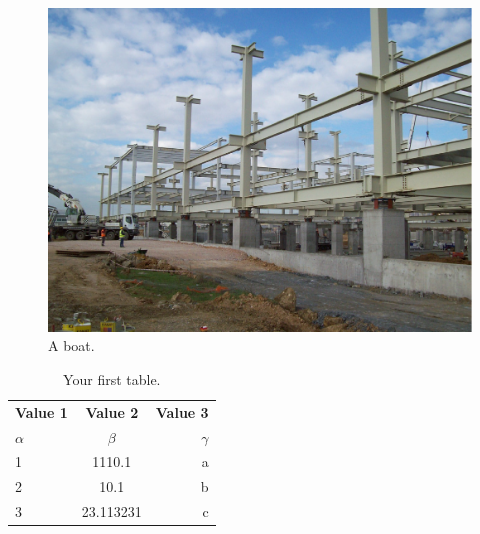 \documentclass[turkish]{eqconf}
\begin{document}
\begin{figure}
	\begin{center}
		\includegraphics[scale=0.4]{b.PNG}
		\caption{A boat.}
		\label{fig:boat1}
\end{center}
\end{figure}


\blindtext

\blindtext

\blindtext

\blindtext

\blindtext \blindtext \blindtext \blindtext

\begin{table}[h!]
	\begin{center}
		\caption{Your first table.}
		\label{tab:table1}
		\begin{tabular}{l|c|r} %
			\textbf{Value 1} & \textbf{Value 2} & \textbf{Value 3}\\
			$\alpha$ & $\beta$ & $\gamma$ \\
			\hline
			1 & 1110.1 & a\\
			2 & 10.1 & b\\
			3 & 23.113231 & c\\
		\end{tabular}
	\end{center}
\end{table}

\blindtext

\blindtext

\blindtext

\blindtext

\blindtext

\blindtext
\end{document}
